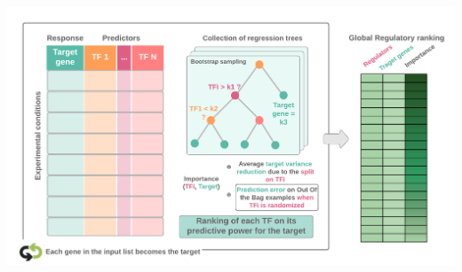 \begin{frame}
\begin{center}
\begin{overprint}
        \includegraphics[scale = 0.38]{Figures/Regression/rf4.png}
    \end{overprint}
    \end{center}
\end{frame}




